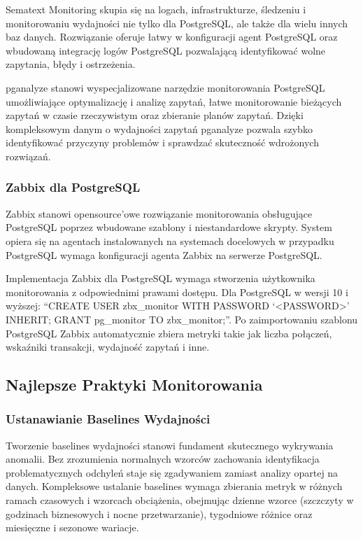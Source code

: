 \documentclass[a4paper,11pt,openany,english]{sphinxmanual}
\begin{document}
\sphinxAtStartPar
Sematext Monitoring skupia się na logach, infrastrukturze, śledzeniu i monitorowaniu wydajności nie tylko dla PostgreSQL, ale także dla wielu innych baz danych. Rozwiązanie oferuje łatwy w konfiguracji agent PostgreSQL oraz wbudowaną integrację logów PostgreSQL pozwalającą identyfikować wolne zapytania, błędy i ostrzeżenia.

\sphinxAtStartPar
pganalyze stanowi wyspecjalizowane narzędzie monitorowania PostgreSQL umożliwiające optymalizację i analizę zapytań, łatwe monitorowanie bieżących zapytań w czasie rzeczywistym oraz zbieranie planów zapytań. Dzięki kompleksowym danym o wydajności zapytań pganalyze pozwala szybko identyfikować przyczyny problemów i sprawdzać skuteczność wdrożonych rozwiązań.


\subsubsection{Zabbix dla PostgreSQL}
\label{\detokenize{rozdzial2/Monitorowanie-i-diagnostyka/index:zabbix-dla-postgresql}}
\sphinxAtStartPar
Zabbix stanowi open\sphinxhyphen{}source’owe rozwiązanie monitorowania obsługujące PostgreSQL poprzez wbudowane szablony i niestandardowe skrypty. System opiera się na agentach instalowanych na systemach docelowych \sphinxhyphen{} w przypadku PostgreSQL wymaga konfiguracji agenta Zabbix na serwerze PostgreSQL.

\sphinxAtStartPar
Implementacja Zabbix dla PostgreSQL wymaga stworzenia użytkownika monitorowania z odpowiednimi prawami dostępu. Dla PostgreSQL w wersji 10 i wyższej: “CREATE USER zbx\_monitor WITH PASSWORD ‘\textless{}PASSWORD\textgreater{}’ INHERIT; GRANT pg\_monitor TO zbx\_monitor;”. Po zaimportowaniu szablonu PostgreSQL Zabbix automatycznie zbiera metryki takie jak liczba połączeń, wskaźniki transakcji, wydajność zapytań i inne.


\subsection{Najlepsze Praktyki Monitorowania}
\label{\detokenize{rozdzial2/Monitorowanie-i-diagnostyka/index:najlepsze-praktyki-monitorowania}}

\subsubsection{Ustanawianie Baselines Wydajności}
\label{\detokenize{rozdzial2/Monitorowanie-i-diagnostyka/index:ustanawianie-baselines-wydajnosci}}
\sphinxAtStartPar
Tworzenie baselines wydajności stanowi fundament skutecznego wykrywania anomalii. Bez zrozumienia normalnych wzorców zachowania identyfikacja problematycznych odchyleń staje się zgadywaniem zamiast analizy opartej na danych. Kompleksowe ustalanie baselines wymaga zbierania metryk w różnych ramach czasowych i wzorcach obciążenia, obejmując dzienne wzorce (szczczyty w godzinach biznesowych i nocne przetwarzanie), tygodniowe różnice oraz miesięczne i sezonowe wariacje.
\end{document}
